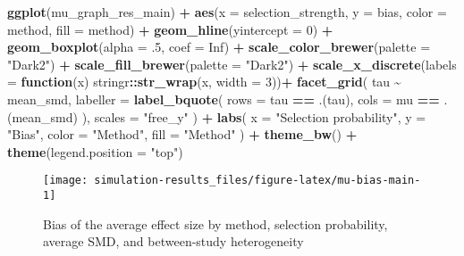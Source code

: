 \documentclass[
]{article}
\newenvironment{Shaded}{\begin{snugshade}}{\end{snugshade}}
\newcommand{\AttributeTok}[1]{\textcolor[rgb]{0.13,0.29,0.53}{#1}}
\newcommand{\ConstantTok}[1]{\textcolor[rgb]{0.56,0.35,0.01}{#1}}
\newcommand{\ControlFlowTok}[1]{\textcolor[rgb]{0.13,0.29,0.53}{\textbf{#1}}}
\newcommand{\DecValTok}[1]{\textcolor[rgb]{0.00,0.00,0.81}{#1}}
\newcommand{\FunctionTok}[1]{\textcolor[rgb]{0.13,0.29,0.53}{\textbf{#1}}}
\newcommand{\NormalTok}[1]{#1}
\newcommand{\SpecialCharTok}[1]{\textcolor[rgb]{0.81,0.36,0.00}{\textbf{#1}}}
\newcommand{\StringTok}[1]{\textcolor[rgb]{0.31,0.60,0.02}{#1}}
\begin{document}
\begin{Shaded}
\begin{Highlighting}[]
\FunctionTok{ggplot}\NormalTok{(mu\_graph\_res\_main) }\SpecialCharTok{+} 
  \FunctionTok{aes}\NormalTok{(}\AttributeTok{x =}\NormalTok{ selection\_strength, }\AttributeTok{y =}\NormalTok{ bias, }\AttributeTok{color =}\NormalTok{ method, }\AttributeTok{fill =}\NormalTok{ method) }\SpecialCharTok{+}
  \FunctionTok{geom\_hline}\NormalTok{(}\AttributeTok{yintercept =} \DecValTok{0}\NormalTok{) }\SpecialCharTok{+}
  \FunctionTok{geom\_boxplot}\NormalTok{(}\AttributeTok{alpha =}\NormalTok{ .}\DecValTok{5}\NormalTok{, }\AttributeTok{coef =} \ConstantTok{Inf}\NormalTok{) }\SpecialCharTok{+}
  \FunctionTok{scale\_color\_brewer}\NormalTok{(}\AttributeTok{palette =} \StringTok{"Dark2"}\NormalTok{) }\SpecialCharTok{+}
  \FunctionTok{scale\_fill\_brewer}\NormalTok{(}\AttributeTok{palette =} \StringTok{"Dark2"}\NormalTok{) }\SpecialCharTok{+}
  \FunctionTok{scale\_x\_discrete}\NormalTok{(}\AttributeTok{labels =} \ControlFlowTok{function}\NormalTok{(x) stringr}\SpecialCharTok{::}\FunctionTok{str\_wrap}\NormalTok{(x, }\AttributeTok{width =} \DecValTok{3}\NormalTok{))}\SpecialCharTok{+}
  \FunctionTok{facet\_grid}\NormalTok{(}
\NormalTok{    tau }\SpecialCharTok{\textasciitilde{}}\NormalTok{ mean\_smd, }
    \AttributeTok{labeller =} \FunctionTok{label\_bquote}\NormalTok{(}
      \AttributeTok{rows =}\NormalTok{ tau }\SpecialCharTok{==}\NormalTok{ .(tau),}
      \AttributeTok{cols =}\NormalTok{ mu }\SpecialCharTok{==}\NormalTok{ .(mean\_smd)}
\NormalTok{    ),}
    \AttributeTok{scales =} \StringTok{"free\_y"}
\NormalTok{  ) }\SpecialCharTok{+}
  \FunctionTok{labs}\NormalTok{(}
    \AttributeTok{x =} \StringTok{"Selection probability"}\NormalTok{, }
    \AttributeTok{y =} \StringTok{"Bias"}\NormalTok{, }
    \AttributeTok{color =} \StringTok{"Method"}\NormalTok{,}
    \AttributeTok{fill =} \StringTok{"Method"}
\NormalTok{  ) }\SpecialCharTok{+} 
  \FunctionTok{theme\_bw}\NormalTok{() }\SpecialCharTok{+}
  \FunctionTok{theme}\NormalTok{(}\AttributeTok{legend.position =} \StringTok{"top"}\NormalTok{)}
\end{Highlighting}
\end{Shaded}

\begin{sidewaysfigure}
\texttt{[image: simulation-results\_files/figure-latex/mu-bias-main-1]} \caption{Bias of the average effect size by method, selection probability, average SMD, and between-study heterogeneity}\label{fig:mu-bias-main}
\end{sidewaysfigure}
\end{document}
